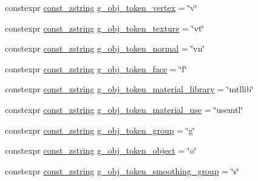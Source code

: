 \begin{DoxyCompactItemize}
\item 
constexpr \mbox{\hyperlink{namespacemage_abfd9206dc607ceb5d13ec68bf075a5c0}{const\+\_\+zstring}} \mbox{\hyperlink{namespacemage_1_1rendering_1_1loader_af514e04ff45fa5aeddcb1cfc24fb77b1}{g\+\_\+obj\+\_\+token\+\_\+vertex}} = \char`\"{}v\char`\"{}
\item 
constexpr \mbox{\hyperlink{namespacemage_abfd9206dc607ceb5d13ec68bf075a5c0}{const\+\_\+zstring}} \mbox{\hyperlink{namespacemage_1_1rendering_1_1loader_a2f28917cef298bc975a0a9b5ceecfb34}{g\+\_\+obj\+\_\+token\+\_\+texture}} = \char`\"{}vt\char`\"{}
\item 
constexpr \mbox{\hyperlink{namespacemage_abfd9206dc607ceb5d13ec68bf075a5c0}{const\+\_\+zstring}} \mbox{\hyperlink{namespacemage_1_1rendering_1_1loader_a1ccd473a1d57fa2581197b20131a7e98}{g\+\_\+obj\+\_\+token\+\_\+normal}} = \char`\"{}vn\char`\"{}
\item 
constexpr \mbox{\hyperlink{namespacemage_abfd9206dc607ceb5d13ec68bf075a5c0}{const\+\_\+zstring}} \mbox{\hyperlink{namespacemage_1_1rendering_1_1loader_ac729da300a11d2af468702b4fd8c17a0}{g\+\_\+obj\+\_\+token\+\_\+face}} = \char`\"{}f\char`\"{}
\item 
constexpr \mbox{\hyperlink{namespacemage_abfd9206dc607ceb5d13ec68bf075a5c0}{const\+\_\+zstring}} \mbox{\hyperlink{namespacemage_1_1rendering_1_1loader_adeb966ab9cb13f0665a23d31d34fc85b}{g\+\_\+obj\+\_\+token\+\_\+material\+\_\+library}} = \char`\"{}mtllib\char`\"{}
\item 
constexpr \mbox{\hyperlink{namespacemage_abfd9206dc607ceb5d13ec68bf075a5c0}{const\+\_\+zstring}} \mbox{\hyperlink{namespacemage_1_1rendering_1_1loader_aca66c986fe0debd4ea787ff4464fbb72}{g\+\_\+obj\+\_\+token\+\_\+material\+\_\+use}} = \char`\"{}usemtl\char`\"{}
\item 
constexpr \mbox{\hyperlink{namespacemage_abfd9206dc607ceb5d13ec68bf075a5c0}{const\+\_\+zstring}} \mbox{\hyperlink{namespacemage_1_1rendering_1_1loader_a71c11c96ce588a1bc2dda43c4b0711c1}{g\+\_\+obj\+\_\+token\+\_\+group}} = \char`\"{}g\char`\"{}
\item 
constexpr \mbox{\hyperlink{namespacemage_abfd9206dc607ceb5d13ec68bf075a5c0}{const\+\_\+zstring}} \mbox{\hyperlink{namespacemage_1_1rendering_1_1loader_a8127f2d8ffe798289f55d789c317ef19}{g\+\_\+obj\+\_\+token\+\_\+object}} = \char`\"{}o\char`\"{}
\item 
constexpr \mbox{\hyperlink{namespacemage_abfd9206dc607ceb5d13ec68bf075a5c0}{const\+\_\+zstring}} \mbox{\hyperlink{namespacemage_1_1rendering_1_1loader_aa21b49ead7809938e24c738c71f408c0}{g\+\_\+obj\+\_\+token\+\_\+smoothing\+\_\+group}} = \char`\"{}s\char`\"{}
\end{DoxyCompactItemize}


